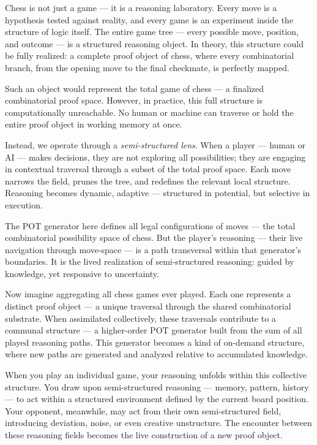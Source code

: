 \documentclass[11pt]{article}
\begin{document}
Chess is not just a game --- it is a reasoning laboratory. Every move is a hypothesis tested against reality, and every game is an experiment inside the structure of logic itself. The entire game tree --- every possible move, position, and outcome --- is a structured reasoning object. In theory, this structure could be fully realized: a complete proof object of chess, where every combinatorial branch, from the opening move to the final checkmate, is perfectly mapped.

Such an object would represent the total game of chess --- a finalized combinatorial proof space. However, in practice, this full structure is computationally unreachable. No human or machine can traverse or hold the entire proof object in working memory at once.

Instead, we operate through a \textit{semi-structured lens}. When a player --- human or AI --- makes decisions, they are not exploring all possibilities; they are engaging in contextual traversal through a subset of the total proof space. Each move narrows the field, prunes the tree, and redefines the relevant local structure. Reasoning becomes dynamic, adaptive --- structured in potential, but selective in execution.

The POT generator here defines all legal configurations of moves --- the total combinatorial possibility space of chess. But the player’s reasoning --- their live navigation through move-space --- is a path transversal within that generator’s boundaries. It is the lived realization of semi-structured reasoning: guided by knowledge, yet responsive to uncertainty.

Now imagine aggregating all chess games ever played. Each one represents a distinct proof object --- a unique traversal through the shared combinatorial substrate. When assimilated collectively, these traversals contribute to a communal structure --- a higher-order POT generator built from the sum of all played reasoning paths. This generator becomes a kind of on-demand structure, where new paths are generated and analyzed relative to accumulated knowledge.

When you play an individual game, your reasoning unfolds within this collective structure. You draw upon semi-structured reasoning --- memory, pattern, history --- to act within a structured environment defined by the current board position. Your opponent, meanwhile, may act from their own semi-structured field, introducing deviation, noise, or even creative unstructure. The encounter between these reasoning fields becomes the live construction of a new proof object.
\end{document}
